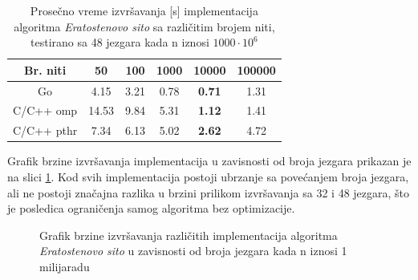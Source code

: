 \documentclass[12pt,oneside]{memoir}
\begin{document}
\begin{table}
\begin{center}
\caption{Prosečno vreme izvršavanja [s] implementacija algoritma \textit{Eratostenovo sito} sa različitim brojem niti, testirano sa 48 jezgara kada n iznosi $1000\cdot10^{6}$}
\begin{tabular}{||c||c c c c c||}
\hline
Br. niti		&50 &100 &1000 &10000&100000\\ \hline
Go		&4.15	&3.21	&0.78&\textbf{0.71}&1.31\\ \hline
C/C++ omp  &14.53&9.84	&5.31&\textbf{1.12}&1.41\\ \hline
C/C++ pthr	&7.34	&6.13	&5.02&\textbf{2.62}&4.72\\ \hline
\end{tabular}
\label{tab:prime5}
\end{center}
\end{table}

Grafik brzine izvršavanja implementacija u zavisnosti od broja jezgara prikazan je na slici \ref{fig:prime3}. Kod svih implementacija postoji ubrzanje sa povećanjem broja jezgara, ali ne postoji značajna razlika u brzini prilikom izvršavanja sa 32  i 48 jezgara, što je posledica ograničenja samog algoritma bez optimizacije.

\begin{figure}
\begin{center}


\caption{Grafik brzine izvršavanja različitih implementacija algoritma \textit{Eratostenovo sito} u zavisnosti od broja jezgara  kada n iznosi 1 milijaradu}
\label{fig:prime3}
\end{center}
\end{figure}
\end{document}

